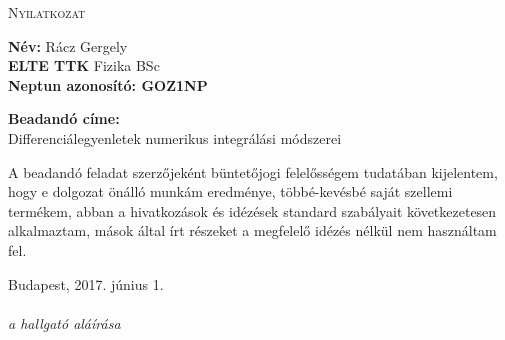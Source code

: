 \newpage
\thispagestyle{empty}
\begin{center}
\Large{ \textsc{Nyilatkozat} }
\end{center}

\vspace*{1cm}
\noindent \textbf{Név:} Rácz Gergely\\
\textbf{ELTE TTK} Fizika BSc \\
\textbf{Neptun azonosító: GOZ1NP} 

\vspace*{0.5cm}
\noindent \textbf{Beadandó címe:} \\
Differenciálegyenletek numerikus integrálási módszerei

\vspace*{2.5cm}
A beadandó feladat szerzőjeként büntetőjogi felelősségem tudatában kijelentem, hogy e dolgozat önálló munkám eredménye, többé-kevésbé saját szellemi termékem, abban a hivatkozások és idézések standard szabályait következetesen alkalmaztam, mások által írt részeket a megfelelő idézés nélkül nem használtam fel.

\vspace*{4.5cm}
\noindent Budapest, 2017. június 1. \\
\hspace*{10.0cm}{.............................................}\\[2ex]
\hspace*{11cm}\emph{a hallgató aláírása}
